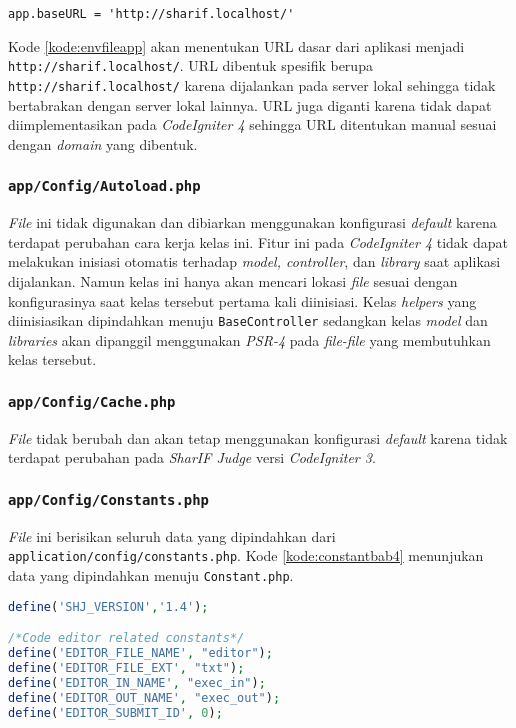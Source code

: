 \begin{lstlisting}[caption= Kode \texttt{application/config/config.php} yang dipindahkan menuju \texttt{.env}, label=kode:envfileapp]
	app.baseURL = 'http://sharif.localhost/'
\end{lstlisting}

Kode \ref{kode:envfileapp} akan menentukan URL dasar dari aplikasi menjadi \texttt{http://sharif.localhost/}. URL dibentuk spesifik berupa \texttt{http://sharif.localhost/} karena dijalankan pada server lokal sehingga tidak bertabrakan dengan server lokal lainnya. URL juga diganti karena tidak dapat diimplementasikan pada \textit{CodeIgniter 4} sehingga URL ditentukan manual sesuai dengan \textit{domain} yang dibentuk.

\subsubsection{\texttt{app/Config/Autoload.php}}
\textit{File} ini tidak digunakan dan dibiarkan menggunakan konfigurasi \textit{default} karena terdapat perubahan cara kerja kelas ini. Fitur ini pada \textit{CodeIgniter 4} tidak dapat melakukan inisiasi otomatis terhadap \textit{model, controller}, dan \textit{library} saat aplikasi dijalankan. Namun kelas ini hanya akan mencari lokasi \textit{file} sesuai dengan konfigurasinya saat kelas tersebut pertama kali diinisiasi. Kelas \textit{helpers} yang diinisiasikan dipindahkan menuju \texttt{BaseController} sedangkan kelas \textit{model} dan \textit{libraries} akan dipanggil menggunakan \textit{PSR-4} pada \textit{file-file} yang membutuhkan kelas tersebut.

\subsubsection{\texttt{app/Config/Cache.php}}
\textit{File} tidak berubah dan akan tetap menggunakan konfigurasi \textit{default} karena tidak terdapat perubahan pada \textit{SharIF Judge} versi \textit{CodeIgniter 3}.

\subsubsection{\texttt{app/Config/Constants.php}}
\textit{File} ini berisikan seluruh data yang dipindahkan dari \texttt{application/config/constants.php}. Kode \ref{kode:constantbab4} menunjukan data yang dipindahkan menuju \texttt{Constant.php}.

\begin{lstlisting}[language=PHP, caption=Pemindahan kode pada \textit{Constant}, label=kode:constantbab4]
define('SHJ_VERSION','1.4');

/*Code editor related constants*/
define('EDITOR_FILE_NAME', "editor");
define('EDITOR_FILE_EXT', "txt");
define('EDITOR_IN_NAME', "exec_in");
define('EDITOR_OUT_NAME', "exec_out");
define('EDITOR_SUBMIT_ID', 0);
\end{lstlisting}


